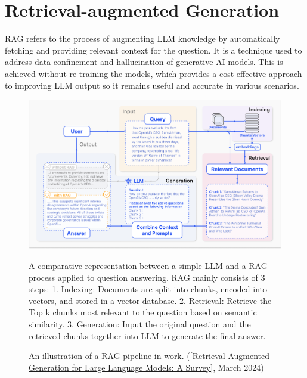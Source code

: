 \section{Retrieval-augmented Generation}
RAG refers to the process of augmenting LLM knowledge by automatically fetching and providing relevant context for the question. It is a technique used to address data confinement and hallucination of generative AI models. This is achieved without re-training the models, which provides a cost-effective approach to improving LLM output so it remains useful and accurate in various scenarios.
\begin{figure}[htbp]
    \centering
    \includegraphics[width=\linewidth]{./figures/RAG_case.png}
    \caption{An illustration of a RAG pipeline in work. (\href{https://arxiv.org/html/2312.10997v5}{[Retrieval-Augmented Generation for Large Language Models: A Survey]}, March 2024)}
    \begin{flushleft}
        \small A comparative representation between a simple LLM and a RAG process applied to question answering. RAG mainly consists of 3 steps: 1. Indexing: Documents are split into chunks, encoded into vectors, and stored in a vector database. 2. Retrieval: Retrieve the Top k chunks most relevant to the question based on semantic similarity. 3. Generation: Input the original question and the retrieved chunks together into LLM to generate the final answer.
    \end{flushleft}
\end{figure}
\newpage

